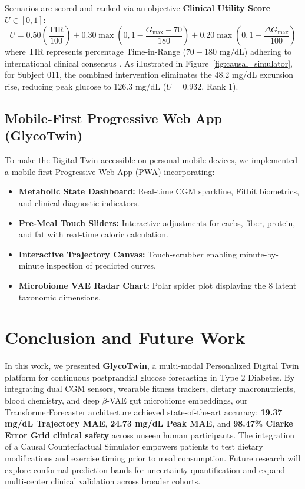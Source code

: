\documentclass[conference]{IEEEtran}
\begin{document}
Scenarios are scored and ranked via an objective \textbf{Clinical Utility Score} $U \in [0, 1]$:
\begin{equation}
    U = 0.50 \left(\frac{\text{TIR}}{100}\right) + 0.30 \max\left(0, 1 - \frac{G_{\max}-70}{180}\right) + 0.20 \max\left(0, 1 - \frac{\Delta G_{\max}}{100}\right)
\end{equation}
where $\text{TIR}$ represents percentage Time-in-Range ($70 - 180\text{ mg/dL}$) adhering to international clinical consensus \cite{battelino2019clinical, danne2017consensus}. As illustrated in Figure~\ref{fig:causal_simulator}, for Subject 011, the combined intervention eliminates the 48.2 mg/dL excursion rise, reducing peak glucose to 126.3 mg/dL ($U = 0.932$, Rank 1).

\subsection{Mobile-First Progressive Web App (GlycoTwin)}
To make the Digital Twin accessible on personal mobile devices, we implemented a mobile-first Progressive Web App (PWA) incorporating:
\begin{itemize}
    \item \textbf{Metabolic State Dashboard:} Real-time CGM sparkline, Fitbit biometrics, and clinical diagnostic indicators.
    \item \textbf{Pre-Meal Touch Sliders:} Interactive adjustments for carbs, fiber, protein, and fat with real-time caloric calculation.
    \item \textbf{Interactive Trajectory Canvas:} Touch-scrubber enabling minute-by-minute inspection of predicted curves.
    \item \textbf{Microbiome VAE Radar Chart:} Polar spider plot displaying the 8 latent taxonomic dimensions.
\end{itemize}

\section{Conclusion and Future Work}
In this work, we presented \textbf{GlycoTwin}, a multi-modal Personalized Digital Twin platform for continuous postprandial glucose forecasting in Type 2 Diabetes. By integrating dual CGM sensors, wearable fitness trackers, dietary macronutrients, blood chemistry, and deep $\beta$-VAE gut microbiome embeddings, our TransformerForecaster architecture achieved state-of-the-art accuracy: \textbf{19.37 mg/dL Trajectory MAE}, \textbf{24.73 mg/dL Peak MAE}, and \textbf{98.47\% Clarke Error Grid clinical safety} across unseen human participants. The integration of a Causal Counterfactual Simulator empowers patients to test dietary modifications and exercise timing prior to meal consumption. Future research will explore conformal prediction bands for uncertainty quantification and expand multi-center clinical validation across broader cohorts.
\end{document}
